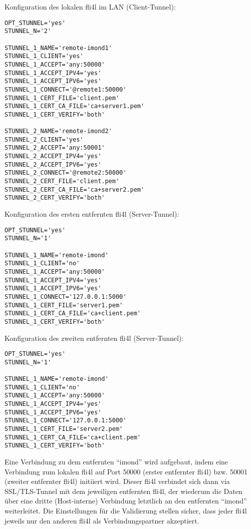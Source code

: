 Konfiguration des lokalen fli4l im LAN (Client-Tunnel):
\begin{example}
\begin{verbatim}
OPT_STUNNEL='yes'
STUNNEL_N='2'

STUNNEL_1_NAME='remote-imond1'
STUNNEL_1_CLIENT='yes'
STUNNEL_1_ACCEPT='any:50000'
STUNNEL_1_ACCEPT_IPV4='yes'
STUNNEL_1_ACCEPT_IPV6='yes'
STUNNEL_1_CONNECT='@remote1:50000'
STUNNEL_1_CERT_FILE='client.pem'
STUNNEL_1_CERT_CA_FILE='ca+server1.pem'
STUNNEL_1_CERT_VERIFY='both'

STUNNEL_2_NAME='remote-imond2'
STUNNEL_2_CLIENT='yes'
STUNNEL_2_ACCEPT='any:50001'
STUNNEL_2_ACCEPT_IPV4='yes'
STUNNEL_2_ACCEPT_IPV6='yes'
STUNNEL_2_CONNECT='@remote2:50000'
STUNNEL_2_CERT_FILE='client.pem'
STUNNEL_2_CERT_CA_FILE='ca+server2.pem'
STUNNEL_2_CERT_VERIFY='both'
\end{verbatim}
\end{example}

Konfiguration des ersten entfernten fli4l (Server-Tunnel):
\begin{example}
\begin{verbatim}
OPT_STUNNEL='yes'
STUNNEL_N='1'

STUNNEL_1_NAME='remote-imond'
STUNNEL_1_CLIENT='no'
STUNNEL_1_ACCEPT='any:50000'
STUNNEL_1_ACCEPT_IPV4='yes'
STUNNEL_1_ACCEPT_IPV6='yes'
STUNNEL_1_CONNECT='127.0.0.1:5000'
STUNNEL_1_CERT_FILE='server1.pem'
STUNNEL_1_CERT_CA_FILE='ca+client.pem'
STUNNEL_1_CERT_VERIFY='both'
\end{verbatim}
\end{example}

Konfiguration des zweiten entfernten fli4l (Server-Tunnel):
\begin{example}
\begin{verbatim}
OPT_STUNNEL='yes'
STUNNEL_N='1'

STUNNEL_1_NAME='remote-imond'
STUNNEL_1_CLIENT='no'
STUNNEL_1_ACCEPT='any:50000'
STUNNEL_1_ACCEPT_IPV4='yes'
STUNNEL_1_ACCEPT_IPV6='yes'
STUNNEL_1_CONNECT='127.0.0.1:5000'
STUNNEL_1_CERT_FILE='server2.pem'
STUNNEL_1_CERT_CA_FILE='ca+client.pem'
STUNNEL_1_CERT_VERIFY='both'
\end{verbatim}
\end{example}

Eine Verbindung zu dem entfernten ``imond'' wird aufgebaut, indem eine
Verbindung zum lokalen fli4l auf Port 50000 (erster entfernter fli4l) bzw.
50001 (zweiter entfernter fli4l) initiiert wird. Dieser fli4l verbindet sich
dann via SSL/TLS-Tunnel mit dem jeweiligen entfernten fli4l, der wiederum
die Daten über eine dritte (Host-interne) Verbindung letztlich an den
entfernten ``imond'' weiterleitet. Die Einstellungen für die Validierung stellen
sicher, dass jeder fli4l jeweils nur den anderen fli4l als Verbindungspartner
akzeptiert.
